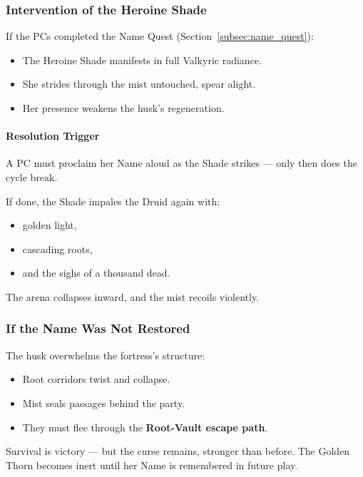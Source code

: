 \documentclass[11pt]{article}
\begin{document}
\subsubsection*{Intervention of the Heroine Shade}

If the PCs completed the Name Quest (Section~\ref{subsec:name_quest}):

\begin{itemize}
  \item The Heroine Shade manifests in full Valkyric radiance.
  \item She strides through the mist untouched, spear alight.
  \item Her presence weakens the husk's regeneration.
\end{itemize}

\paragraph{Resolution Trigger}
A PC must proclaim her Name aloud as the Shade strikes ---  
only then does the cycle break.

\medskip
If done, the Shade impales the Druid again with:
\begin{itemize}
  \item golden light,
  \item cascading roots,
  \item and the sighs of a thousand dead.
\end{itemize}

The arena collapses inward, and the mist recoils violently.

\subsubsection*{If the Name Was Not Restored}

The husk overwhelms the fortress's structure:

\begin{itemize}
  \item Root corridors twist and collapse.
  \item Mist seals passages behind the party.
  \item They must flee through the \textbf{Root-Vault escape path}.
\end{itemize}

Survival is victory --- but the curse remains, stronger than before.  
The Golden Thorn becomes inert until her Name is remembered in future play.
\end{document}
